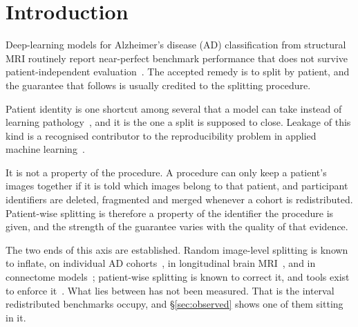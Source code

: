 \documentclass[pdflatex,sn-vancouver-num]{sn-jnl}
\begin{document}

\maketitle


\section{Introduction}
\label{sec:introduction}

Deep-learning models for Alzheimer's disease (AD) classification from
structural MRI routinely report near-perfect benchmark performance that does
not survive patient-independent evaluation~\cite{wen2020,yagis2021,diagnostics2025}.
The accepted remedy is to split by patient, and the guarantee that follows is
usually credited to the splitting procedure.

Patient identity is one shortcut among several that a model can take instead of
learning pathology~\cite{geirhos2020shortcut,degrave2021shortcuts,zech2018variable},
and it is the one a split is supposed to close. Leakage of this kind is a
recognised contributor to the reproducibility problem in applied machine
learning~\cite{kapoor2023leakage,varoquaux2022failures,oakden2020hidden,roberts2021pitfalls}.

It is not a property of the procedure. A procedure can only keep a patient's
images together if it is told which images belong to that patient, and
participant identifiers are deleted, fragmented and merged whenever a cohort is
redistributed. Patient-wise splitting is therefore a property of the identifier
the procedure is given, and the strength of the guarantee varies with the
quality of that evidence.

The two ends of this axis are established. Random image-level splitting is
known to inflate, on individual AD cohorts~\cite{wen2020,yagis2021}, in
longitudinal brain MRI~\cite{rumala2023}, and in connectome
models~\cite{rosenblatt2024}; patient-wise splitting is known to correct it, and
tools exist to enforce it~\cite{datasail2025}. What lies between has not been
measured. That is the interval redistributed benchmarks occupy, and
\S\ref{sec:observed} shows one of them sitting in it.
\end{document}
